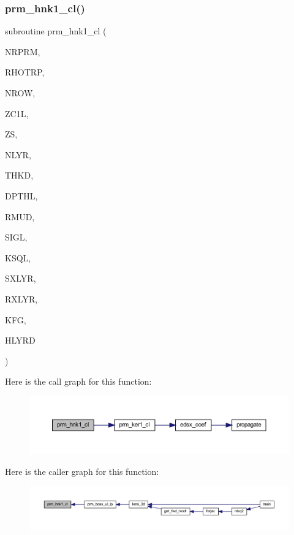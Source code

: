 \subsubsection{\texorpdfstring{prm\+\_\+hnk1\+\_\+cl()}{prm\_hnk1\_cl()}}
{\footnotesize\ttfamily subroutine prm\+\_\+hnk1\+\_\+cl (\begin{DoxyParamCaption}\item[{integer}]{N\+R\+P\+RM,  }\item[{real, dimension(nrprm)}]{R\+H\+O\+T\+RP,  }\item[{integer}]{N\+R\+OW,  }\item[{real, dimension(nrow)}]{Z\+C1L,  }\item[{real(kind=ql)}]{ZS,  }\item[{integer}]{N\+L\+YR,  }\item[{real(kind=ql), dimension (nlyr)}]{T\+H\+KD,  }\item[{real(kind=ql), dimension (nlyr)}]{D\+P\+T\+HL,  }\item[{real(kind=ql), dimension(0\+:nlyr)}]{R\+M\+UD,  }\item[{complex(kind=ql), dimension (nlyr)}]{S\+I\+GL,  }\item[{complex(kind=ql), dimension (nlyr)}]{K\+S\+QL,  }\item[{integer}]{S\+X\+L\+YR,  }\item[{integer}]{R\+X\+L\+YR,  }\item[{integer}]{K\+FG,  }\item[{complex(kind=ql), dimension(nrprm,3,nrow)}]{H\+L\+Y\+RD }\end{DoxyParamCaption})}

Here is the call graph for this function\+:\nopagebreak
\begin{figure}[H]
\begin{center}
\leavevmode
\includegraphics[width=350pt]{Leroi_8f90_a5285d5a2942c499f6219805b1e689588_cgraph}
\end{center}
\end{figure}
Here is the caller graph for this function\+:\nopagebreak
\begin{figure}[H]
\begin{center}
\leavevmode
\includegraphics[width=350pt]{Leroi_8f90_a5285d5a2942c499f6219805b1e689588_icgraph}
\end{center}
\end{figure}
\mbox{\label{Leroi_8f90_a90b2b96ee9e9153503bfd5d5bf7d1d0e}} 
